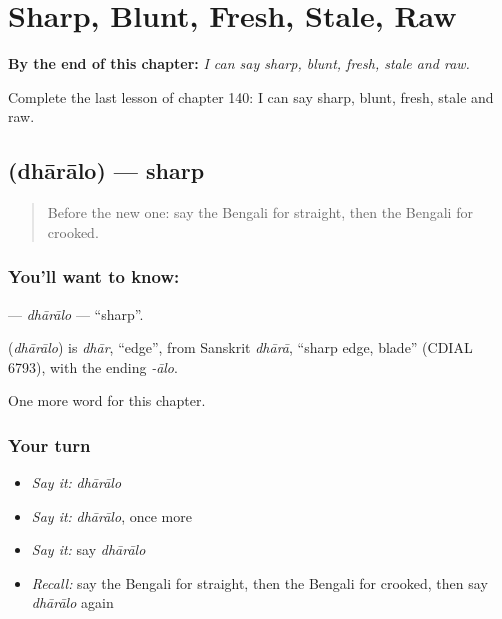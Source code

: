 
\chapter{Sharp, Blunt, Fresh, Stale, Raw}
\label{ch:bn-sharp-blunt-fresh-stale-raw}

\begin{chapteropening}
\textbf{By the end of this chapter:} \emph{I can say sharp, blunt, fresh, stale and raw.}

Complete the last lesson of chapter 140: I can say sharp, blunt, fresh, stale and raw.
\end{chapteropening}

\section[\texorpdfstring{\bn{ধারালো} (dhārālo)}{ধারালো (dhārālo)}]{ (dhārālo) — sharp}

\label{lesson:BN-C140-dharalo}



\begin{quote}
Before the new one: say the Bengali for straight, then the Bengali for crooked.
\end{quote}

\subsection*{You'll want to know: }
\textbf{} — \emph{dhārālo} — \textquotedblleft{}sharp\textquotedblright{}.

\begin{cousinweb}
\textbf{} (\emph{dhārālo}) is \emph{dhār}, \textquotedblleft{}edge\textquotedblright{}, from Sanskrit \emph{dhārā}, \textquotedblleft{}sharp edge, blade\textquotedblright{} (CDIAL 6793), with the ending \emph{-ālo}.
\end{cousinweb}

\begin{grammarlens}[title={What you've built}]
One more word for this chapter.
\end{grammarlens}

\subsection*{Your turn}
\begin{itemize}
\raggedright
  \item \emph{Say it:} \emph{dhārālo}
  \item \emph{Say it:} \emph{dhārālo}, once more
  \item \emph{Say it:} say \emph{dhārālo}
  \item \emph{Recall:} say the Bengali for straight, then the Bengali for crooked, then say \emph{dhārālo} again
\end{itemize}

